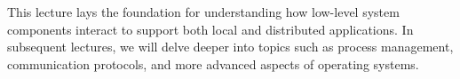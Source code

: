 This lecture lays the foundation for understanding how low-level system components interact to support both local and distributed applications. In subsequent lectures, we will delve deeper into topics such as process management, communication protocols, and more advanced aspects of operating systems.
